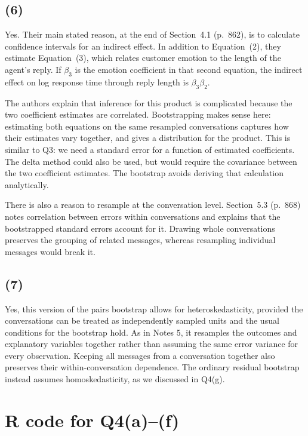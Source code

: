 \documentclass[11pt]{article}
\begin{document}
\subsection{(6)}
Yes. Their main stated reason, at the end of Section~4.1 (p.~862), is
to calculate confidence intervals for an indirect effect. In addition
to Equation~(2), they estimate Equation~(3), which relates customer
emotion to the length of the agent's reply. If $\beta_3$ is the emotion
coefficient in that second equation, the indirect effect on log response
time through reply length is $\beta_3\beta_2$.

The authors explain that inference for this product is complicated
because the two coefficient estimates are correlated. Bootstrapping
makes sense here: estimating both equations on the same resampled
conversations captures how their estimates vary together, and gives a
distribution for the product. This is similar to Q3: we need a standard error for a function of
estimated coefficients. The delta method could also be used, but would
require the covariance between the two coefficient estimates. The
bootstrap avoids deriving that calculation analytically.

There is also a reason to resample at the conversation level. Section~5.3
(p.~868) notes correlation between errors within conversations and
explains that the bootstrapped standard errors account for it. Drawing
whole conversations preserves the grouping of related messages, whereas
resampling individual messages would break it.

\subsection{(7)}
Yes, this version of the pairs bootstrap allows for heteroskedasticity,
provided the conversations can be treated as independently sampled
units and the usual conditions for the bootstrap hold. As in Notes 5,
it resamples the outcomes and explanatory variables together rather
than assuming the same error variance for every observation. Keeping
all messages from a conversation together also preserves their
within-conversation dependence. The ordinary residual bootstrap instead
assumes homoskedasticity, as we discussed in Q4(g).

\clearpage
\appendix
\section{R code for Q4(a)--(f)}

\end{document}
